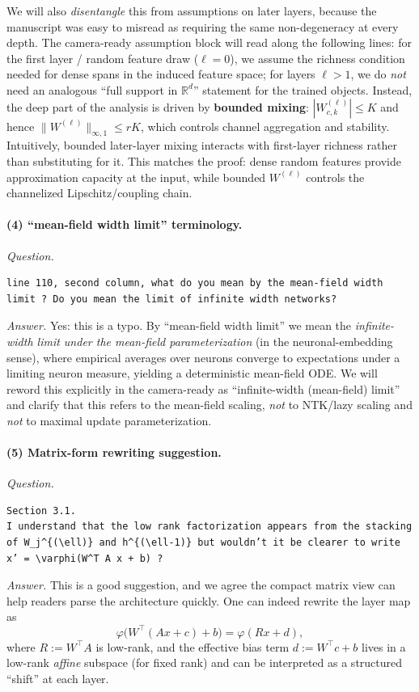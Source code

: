 \documentclass[11pt,a4paper]{article}
\begin{document}
We will also \emph{disentangle} this from assumptions on later layers, because the manuscript was easy to misread as requiring the same non-degeneracy at every depth. The camera-ready assumption block will read along the following lines: for the first layer / random feature draw ($\ell=0$), we assume the richness condition needed for dense spans in the induced feature space; for layers $\ell>1$, we do \emph{not} need an analogous ``full support in $\mathbb{R}^d$'' statement for the trained objects. Instead, the deep part of the analysis is driven by \textbf{bounded mixing}: $|W^{(\ell)}_{c,k}|\le K$ and hence $\|W^{(\ell)}\|_{\infty,1}\le rK$, which controls channel aggregation and stability. Intuitively, bounded later-layer mixing interacts with first-layer richness rather than substituting for it. This matches the proof: dense random features provide approximation capacity at the input, while bounded $W^{(\ell)}$ controls the channelized Lipschitz/coupling chain.

\paragraph{(4) ``mean-field width limit'' terminology.}
\textit{Question.}\par
\begin{verbatim}
line 110, second column, what do you mean by the mean-field width limit ? Do you mean the limit of infinite width networks?
\end{verbatim}
\textit{Answer.} Yes: this is a typo. By ``mean-field width limit'' we mean the \emph{infinite-width limit under the mean-field parameterization} (in the neuronal-embedding sense), where empirical averages over neurons converge to expectations under a limiting neuron measure, yielding a deterministic mean-field ODE. We will reword this explicitly in the camera-ready as ``infinite-width (mean-field) limit'' and clarify that this refers to the mean-field scaling, \emph{not} to NTK/lazy scaling and \emph{not} to maximal update parameterization.

\paragraph{(5) Matrix-form rewriting suggestion.}
\textit{Question.}\par
\begin{verbatim}
Section 3.1.
I understand that the low rank factorization appears from the stacking of W_j^{(\ell)} and h^{(\ell-1)} but wouldn’t it be clearer to write x’ = \varphi(W^T A x + b) ?
\end{verbatim}
\textit{Answer.} This is a good suggestion, and we agree the compact matrix view can help readers parse the architecture quickly. One can indeed rewrite the layer map as
\[
\varphi\!\big(W^\top(Ax+c)+b\big)=\varphi(Rx+d),
\]
where $R:=W^\top A$ is low-rank, and the effective bias term $d:=W^\top c+b$ lives in a low-rank \emph{affine} subspace (for fixed rank) and can be interpreted as a structured ``shift'' at each layer.
\end{document}
